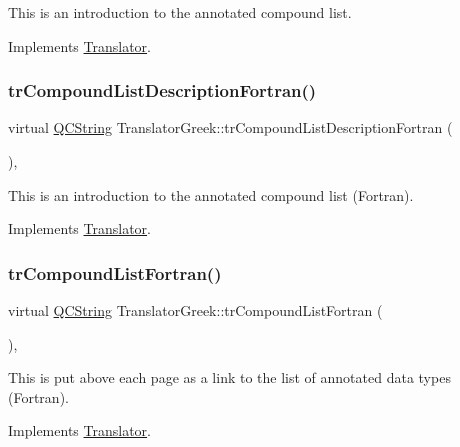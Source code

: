 This is an introduction to the annotated compound list. 

Implements \mbox{\hyperlink{class_translator}{Translator}}.

\mbox{\label{class_translator_greek_a7f4b66ce35a016c70795c10795165241}} 
\subsubsection{\texorpdfstring{trCompoundListDescriptionFortran()}{trCompoundListDescriptionFortran()}}
{\footnotesize\ttfamily virtual \mbox{\hyperlink{class_q_c_string}{Q\+C\+String}} Translator\+Greek\+::tr\+Compound\+List\+Description\+Fortran (\begin{DoxyParamCaption}{ }\end{DoxyParamCaption})\hspace{0.3cm}{\ttfamily [inline]}, {\ttfamily [virtual]}}

This is an introduction to the annotated compound list (Fortran). 

Implements \mbox{\hyperlink{class_translator}{Translator}}.

\mbox{\label{class_translator_greek_ad4920d1174a3b7b4eaca8daa3fb3d12a}} 
\subsubsection{\texorpdfstring{trCompoundListFortran()}{trCompoundListFortran()}}
{\footnotesize\ttfamily virtual \mbox{\hyperlink{class_q_c_string}{Q\+C\+String}} Translator\+Greek\+::tr\+Compound\+List\+Fortran (\begin{DoxyParamCaption}{ }\end{DoxyParamCaption})\hspace{0.3cm}{\ttfamily [inline]}, {\ttfamily [virtual]}}

This is put above each page as a link to the list of annotated data types (Fortran). 

Implements \mbox{\hyperlink{class_translator}{Translator}}.

